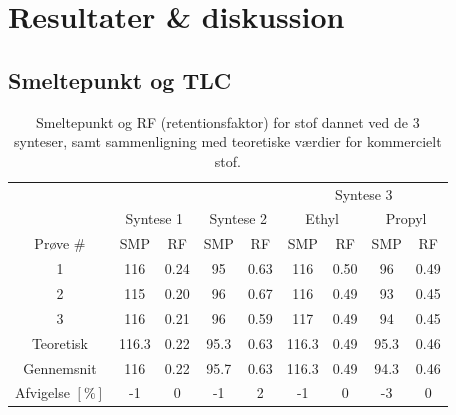 \section{Resultater \& diskussion}
    \subsection{Smeltepunkt og TLC}
    \begin{table}[H]\centering
        \caption{Smeltepunkt og RF (retentionsfaktor) for stof dannet ved de 3 synteser, samt sammenligning med teoretiske værdier for kommercielt stof.}
        \begin{tabular*}{\linewidth}{c@{\extracolsep{\fill}}cccccccc}
            \toprule
            & & & & & \multicolumn{4}{c}{Syntese 3} \\
            \cmidrule(r){6-9}
            & \multicolumn{2}{c}{Syntese 1} & \multicolumn{2}{c}{Syntese 2} & \multicolumn{2}{c}{Ethyl} & \multicolumn{2}{c}{Propyl} \\
            \cmidrule(r){2-3} \cmidrule(r){4-5} \cmidrule(r){6-7} \cmidrule(r){8-9}
            Prøve \# & SMP & RF & SMP & RF & SMP & RF & SMP & RF \\
            \midrule
            1 & 116 & 0.24 & 95 & 0.63 & 116 & 0.50 & 96 & 0.49 \\
            2 & 115 & 0.20 & 96 & 0.67 & 116 & 0.49 & 93 & 0.45 \\
            3 & 116 & 0.21 & 96 & 0.59 & 117 & 0.49 & 94 & 0.45 \\
            \midrule
            Teoretisk & 116.3 & 0.22 & 95.3 & 0.63 & 116.3 & 0.49 & 95.3 & 0.46 \\
            Gennemsnit & 116 & 0.22 & 95.7 & 0.63 & 116.3 & 0.49 & 94.3 & 0.46 \\
            \midrule
            Afvigelse $\left[\si{\%}\right]$ & -1 & 0 & -1 & 2 & -1 & 0 & -3 & 0 \\
            \bottomrule
        \end{tabular*}
    \end{table}
